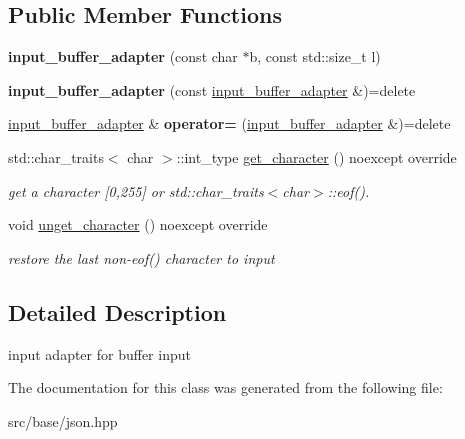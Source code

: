 \subsection*{Public Member Functions}
\begin{DoxyCompactItemize}
\item 
\mbox{\label{classnlohmann_1_1detail_1_1input__buffer__adapter_aee9d094d369bcd8f110eae4a175a8fa9}} 
{\bfseries input\+\_\+buffer\+\_\+adapter} (const char $\ast$b, const std\+::size\+\_\+t l)
\item 
\mbox{\label{classnlohmann_1_1detail_1_1input__buffer__adapter_ada76d7b75c5d6b989af0e18687ef07b6}} 
{\bfseries input\+\_\+buffer\+\_\+adapter} (const \mbox{\hyperlink{classnlohmann_1_1detail_1_1input__buffer__adapter}{input\+\_\+buffer\+\_\+adapter}} \&)=delete
\item 
\mbox{\label{classnlohmann_1_1detail_1_1input__buffer__adapter_a0871125057d993684ba8e45fb2b8a76b}} 
\mbox{\hyperlink{classnlohmann_1_1detail_1_1input__buffer__adapter}{input\+\_\+buffer\+\_\+adapter}} \& {\bfseries operator=} (\mbox{\hyperlink{classnlohmann_1_1detail_1_1input__buffer__adapter}{input\+\_\+buffer\+\_\+adapter}} \&)=delete
\item 
\mbox{\label{classnlohmann_1_1detail_1_1input__buffer__adapter_ae9e195b04f3551fafb0925aafba00124}} 
std\+::char\+\_\+traits$<$ char $>$\+::int\+\_\+type \mbox{\hyperlink{classnlohmann_1_1detail_1_1input__buffer__adapter_ae9e195b04f3551fafb0925aafba00124}{get\+\_\+character}} () noexcept override
\begin{DoxyCompactList}\small\item\em get a character \mbox{[}0,255\mbox{]} or std\+::char\+\_\+traits$<$char$>$\+::eof(). \end{DoxyCompactList}\item 
\mbox{\label{classnlohmann_1_1detail_1_1input__buffer__adapter_ae2464d8e963d2ae617b080f2df2550a1}} 
void \mbox{\hyperlink{classnlohmann_1_1detail_1_1input__buffer__adapter_ae2464d8e963d2ae617b080f2df2550a1}{unget\+\_\+character}} () noexcept override
\begin{DoxyCompactList}\small\item\em restore the last non-\/eof() character to input \end{DoxyCompactList}\end{DoxyCompactItemize}


\subsection{Detailed Description}
input adapter for buffer input 

The documentation for this class was generated from the following file\+:\begin{DoxyCompactItemize}
\item 
src/base/json.\+hpp\end{DoxyCompactItemize}
